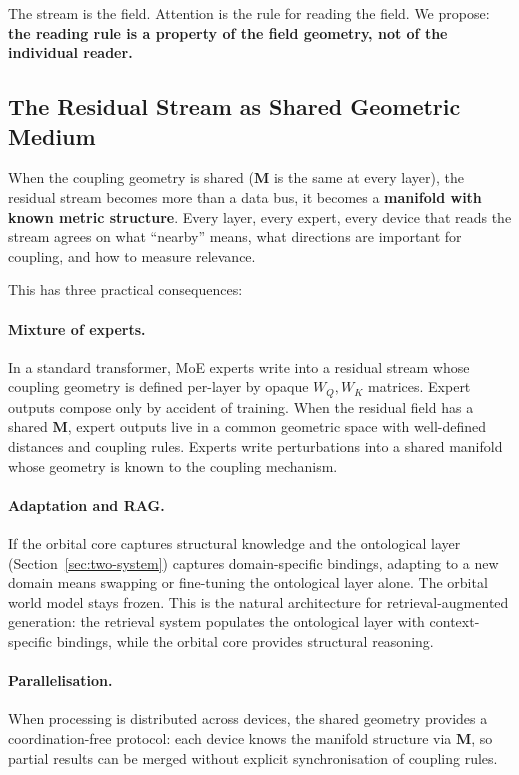 \documentclass[11pt, a4paper]{article}
\newcommand{\M}{\mathbf{M}}
\theoremstyle{remark}
\begin{document}
The stream is the field.
Attention is the rule for reading the field.
We propose: \textbf{the reading rule is a property of the field geometry, not of the individual reader.}

\subsection{The Residual Stream as Shared Geometric Medium}

When the coupling geometry is shared ($\M$ is the same at every layer), the residual stream becomes more than a data bus, it becomes a \textbf{manifold with known metric structure}.
Every layer, every expert, every device that reads the stream agrees on what ``nearby'' means, what directions are important for coupling, and how to measure relevance.

This has three practical consequences:

\paragraph{Mixture of experts.}
In a standard transformer, MoE experts write into a residual stream whose coupling geometry is defined per-layer by opaque $W_Q, W_K$ matrices.
Expert outputs compose only by accident of training.
When the residual field has a shared $\M$, expert outputs live in a common geometric space with well-defined distances and coupling rules.
Experts write perturbations into a shared manifold whose geometry is known to the coupling mechanism.

\paragraph{Adaptation and RAG.}
If the orbital core captures structural knowledge and the ontological layer (Section~\ref{sec:two-system}) captures domain-specific bindings, adapting to a new domain means swapping or fine-tuning the ontological layer alone.
The orbital world model stays frozen.
This is the natural architecture for retrieval-augmented generation: the retrieval system populates the ontological layer with context-specific bindings, while the orbital core provides structural reasoning.

\paragraph{Parallelisation.}
When processing is distributed across devices, the shared geometry provides a coordination-free protocol: each device knows the manifold structure via $\M$, so partial results can be merged without explicit synchronisation of coupling rules.
\end{document}
